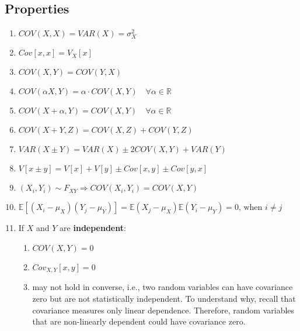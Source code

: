 \subsection*{Properties}
\begin{enumerate}
    \item $COV(X, X) = VAR(X) = \sigma_X^2$ 
    \hfill \cite{ism-1}

    \item $Cov[x, x] = V_X[x]$ 
    \hfill \cite{mfml-1}

    \item $COV(X, Y) = COV(Y, X)$ 
    \hfill \cite{ism-1}

    \item $
        COV(\alpha X, Y) = \alpha \cdot COV(X, Y) 
        \quad \forall \alpha \in \mathbb{R}
    $ 
    \hfill \cite{ism-1}

    \item $
        COV(X + \alpha, Y) = COV(X, Y) 
        \quad \forall \alpha \in \mathbb{R}
    $ 
    \hfill \cite{ism-1}

    \item $COV(X + Y, Z) = COV(X, Z) + COV(Y, Z)$ 
    \hfill \cite{ism-1}

    \item $VAR(X \pm Y) = VAR(X) \pm 2COV(X, Y) + VAR(Y)$ 
    \hfill \cite{ism-1}

    \item $V[x \pm y] = V[x] + V[y] \pm Cov[x, y] \pm Cov[y, x]$ 
    \hfill \cite{mfml-1}

    \item $
        (X_i, Y_i) \sim F_{XY}
        \Rightarrow 
        COV(X_i, Y_i) = COV(X, Y)$ 
    \hfill \cite{ism-1}

    \item $
        \mathbb{E}[(X_i - \mu_X)(Y_j - \mu_Y)] 
        = \mathbb{E}(X_j - \mu_X)\mathbb{E}(Y_i - \mu_Y) 
        = 0  \text{, when } i \neq j
    $
    \hfill \cite{ism-1}

    \item If $X$ and $Y$ are \textbf{independent}:
    \begin{enumerate}
        \item $COV(X, Y) = 0$ \hfill \cite{ism-1}
        
        \item $Cov_{X,Y}[x, y] = 0$ \hfill \cite{mfml-1}

        \item may not hold in converse, i.e., two random variables can have covariance zero but are not statistically independent. To understand why, recall that covariance measures only linear dependence. Therefore, random variables that are non-linearly dependent could have covariance zero. \cite{mfml-1}
        

\end{enumerate}
\end{enumerate}
